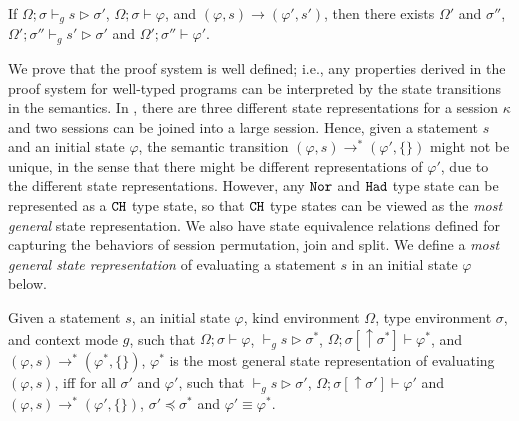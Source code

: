 \begin{theorem}\label{thm:type-preservation-oqasm}\rm 
If $\Omega;\sigma \vdash_g s \triangleright \sigma'$, $\Omega;\sigma \vdash \varphi$, and $(\varphi,s)\longrightarrow (\varphi',s')$, then 
there exists $\Omega'$ and $\sigma''$, $\Omega';\sigma'' \vdash_g s' \triangleright \sigma'$ and $\Omega';\sigma'' \vdash \varphi'$.
\end{theorem}

We prove that the \qafny proof system is well defined; i.e., any properties derived in the \qafny proof system for well-typed \qafny programs can be interpreted by the state transitions in the \qafny semantics.
In \qafny, there are three different state representations for a session $\kappa$ and two sessions can be joined into a large session.
Hence, given a statement $s$ and an initial state $\varphi$, the semantic transition $(\varphi,s) \longrightarrow^{*} (\varphi',\{\})$ might not be unique, in the sense that there might be different representations of $\varphi'$, due to the different state representations.
However, any $\texttt{Nor}$ and $\texttt{Had}$ type state can be represented as a $\texttt{CH}$ type state, so that $\texttt{CH}$ type states can be viewed as the \emph{most general} state representation. We also have state equivalence relations defined for capturing the behaviors of session permutation, join and split. We define a \emph{most general state representation} of evaluating a statement $s$ in an initial state $\varphi$ below.

\begin{definition}\label{def:most-gen}\rm 
  Given a statement $s$, an initial state $\varphi$, kind environment $\Omega$, type environment $\sigma$, and context mode $g$, such that $\Omega;\sigma\vdash \varphi$, $\vdash_g s \triangleright \sigma^*$, $\Omega;\sigma[\uparrow \sigma^*]\vdash \varphi^*$, and $(\varphi,s) \longrightarrow^{*} (\varphi^*,\{\})$, $\varphi^*$ is the most general state representation of evaluating $(\varphi,s)$, iff for all $\sigma'$ and $\varphi'$, such that $\vdash_g s \triangleright \sigma'$, $\Omega;\sigma[\uparrow \sigma']\vdash \varphi'$ and $(\varphi,s) \longrightarrow^{*} (\varphi',\{\})$, $\sigma' \preceq \sigma^*$ and $\varphi' \equiv \varphi^*$.
\end{definition}

